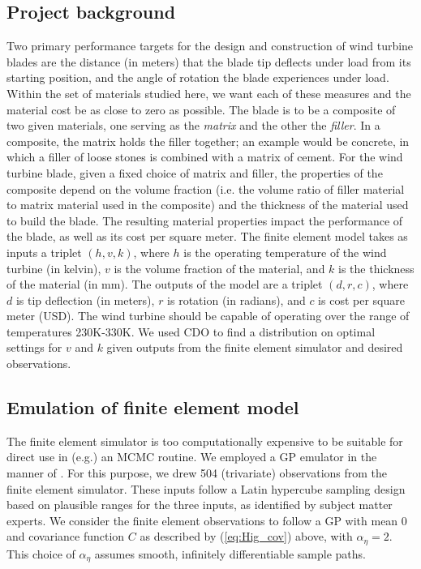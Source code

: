 \documentclass[12pt]{article}
\begin{document}
\subsection{Project background}

Two primary performance targets for the design and construction of wind turbine blades are the distance (in meters) that the blade tip deflects under load from its starting position, and the angle of rotation the blade experiences under load.
%
Within the set of materials studied here, we want each of these measures and the material cost be as close to zero as possible.
%
The blade is to be a composite of two given materials, one serving as the \textit{matrix} and the other the \textit{filler}. 
%
In a composite, the matrix holds the filler together; an example would be concrete, in which a filler of loose stones is combined with a matrix of cement.
%
For the wind turbine blade, given a fixed choice of matrix and filler, the properties of the composite depend on the volume fraction (i.e. the volume ratio of filler material to matrix material used in the composite) and the thickness of the material used to build the blade. 
%
The resulting material properties impact the performance of the blade, as well as its cost per square meter. 
%
The finite element model takes as inputs a triplet $(h,v,k)$, where $h$ is the operating temperature of the wind turbine (in kelvin), $v$ is the volume fraction of the material, and $k$ is the thickness of the material (in mm). 
%
The outputs of the model are a triplet $(d,r,c)$, where $d$ is tip deflection (in meters), $r$ is rotation (in radians), and $c$ is cost per square meter (USD).
% 
The wind turbine should be capable of operating over the range of temperatures 230K-330K. 
%
We used CDO to find a distribution on optimal settings for $v$ and $k$ given outputs from the finite element simulator and desired observations.

\subsection{Emulation of finite element model}\label{emulator}
The finite element simulator is too computationally expensive to be suitable for direct use in (e.g.) an MCMC routine. 
%
We employed a GP emulator in the manner of \cite{Williams2006}. 
%
For this purpose, we drew 504 (trivariate) observations from the finite element simulator. 
%
These inputs follow a Latin hypercube sampling design \citep{McKay1979} based on plausible ranges for the three inputs, as identified by subject matter experts.
%
We consider the finite element observations to follow a GP with mean 0 and covariance function $C$ as described by (\ref{eq:Hig_cov}) above, with $\alpha_\eta=2$. 
%
This choice of $\alpha_\eta$ assumes smooth, infinitely differentiable sample paths. 
%
\end{document}
